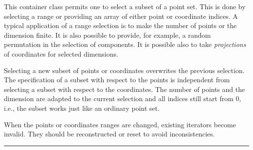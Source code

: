 
This container class permits one to select a subset of a point set. 
This is done by selecting a range or providing an array of either
point or coordinate indices.  A typical application of a range selection
is to make the number of points or the dimension finite. It is also 
possible to provide, for example, a random permutation in the selection of
components. It is possible also to take \emph{projections} of coordinates
for selected dimensions. 

Selecting a new subset of points or coordinates overwrites the previous
selection.  The specification of a subset with respect to the points
is independent from selecting a subset with respect to the coordinates.
The number of points and the dimension are adapted
to the current selection and all indices still start from 0,
i.e., the subset works just like an ordinary point set.


When the points or coordinates ranges are changed, existing iterators
become invalid.  They should be reconstructed or reset to avoid
inconsistencies.


\bigskip\hrule\bigskip

